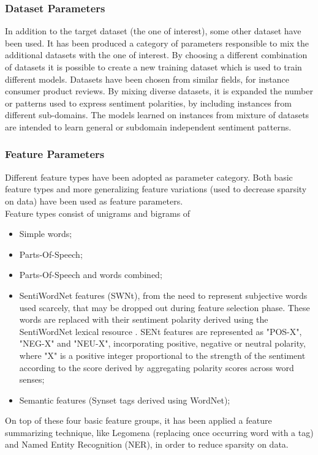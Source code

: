 \subsubsection{Dataset Parameters}

In addition to the target dataset (the one of interest), some other dataset have been used. It has been produced a category of parameters responsible to mix the additional datasets with the one of interest. By choosing a different combination of datasets it is possible to create a new training dataset which is used to train different models. Datasets have been chosen from similar fields, for instance consumer product reviews. By mixing diverse datasets, it is expanded the number or patterns used to express sentiment polarities, by including instances from different sub-domains. The models learned on instances from mixture of datasets are intended to learn general or subdomain independent sentiment patterns.

\subsubsection{Feature Parameters}

Different feature types have been adopted as parameter category. Both basic feature types and more generalizing feature variations (used to decrease sparsity on data) have been used as feature parameters.\\
Feature types consist of unigrams and bigrams of
\begin{itemize}
	\item Simple words;
	\item Parts-Of-Speech;
	\item Parts-Of-Speech and words combined;
	\item SentiWordNet features (SWNt), from the need to represent subjective words used scarcely, that may be dropped out during feature selection phase. These words are replaced with their sentiment polarity derived using the SentiWordNet lexical resource \cite{Esuli2006sentiwordnet}. SENt features are represented as "POS-X", "NEG-X" and "NEU-X", incorporating positive, negative or neutral polarity, where "X" is a positive integer proportional to the strength of the sentiment according to the score derived by aggregating polarity scores across word senses;
	\item Semantic features (Synset tags derived using WordNet);
\end{itemize}

On top of these four basic feature groups, it has been applied a feature summarizing technique, like Legomena (replacing once occurring word with a tag) and Named Entity Recognition (NER), in order to reduce sparsity on data.

